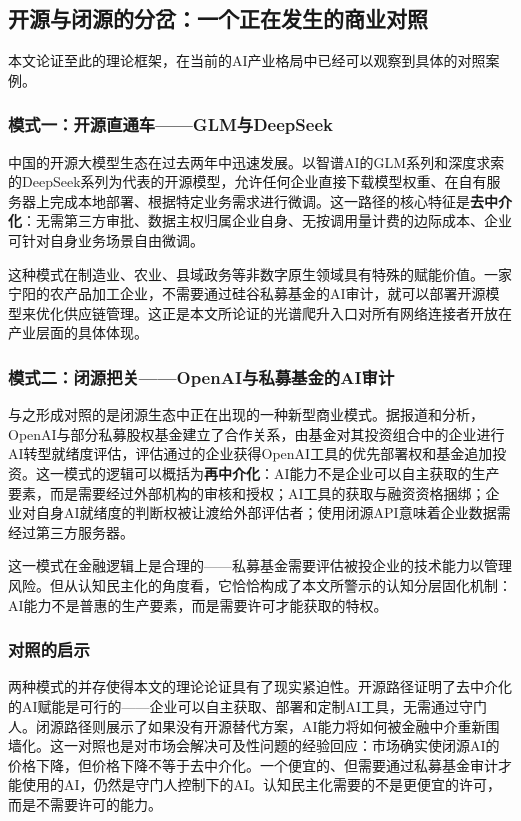 \documentclass[12pt,a4paper]{ctexart}
\begin{document}
\subsection{开源与闭源的分岔：一个正在发生的商业对照}

本文论证至此的理论框架，在当前的AI产业格局中已经可以观察到具体的对照案例。

\subsubsection{模式一：开源直通车——GLM与DeepSeek}

中国的开源大模型生态在过去两年中迅速发展。以智谱AI的GLM系列和深度求索的DeepSeek系列为代表的开源模型，允许任何企业直接下载模型权重、在自有服务器上完成本地部署、根据特定业务需求进行微调。这一路径的核心特征是\textbf{去中介化}：无需第三方审批、数据主权归属企业自身、无按调用量计费的边际成本、企业可针对自身业务场景自由微调。

这种模式在制造业、农业、县域政务等非数字原生领域具有特殊的赋能价值。一家宁阳的农产品加工企业，不需要通过硅谷私募基金的AI审计，就可以部署开源模型来优化供应链管理。这正是本文所论证的光谱爬升入口对所有网络连接者开放在产业层面的具体体现。

\subsubsection{模式二：闭源把关——OpenAI与私募基金的AI审计}

与之形成对照的是闭源生态中正在出现的一种新型商业模式。据报道和分析，OpenAI与部分私募股权基金建立了合作关系，由基金对其投资组合中的企业进行AI转型就绪度评估，评估通过的企业获得OpenAI工具的优先部署权和基金追加投资。这一模式的逻辑可以概括为\textbf{再中介化}：AI能力不是企业可以自主获取的生产要素，而是需要经过外部机构的审核和授权；AI工具的获取与融资资格捆绑；企业对自身AI就绪度的判断权被让渡给外部评估者；使用闭源API意味着企业数据需经过第三方服务器。

这一模式在金融逻辑上是合理的——私募基金需要评估被投企业的技术能力以管理风险。但从认知民主化的角度看，它恰恰构成了本文所警示的认知分层固化机制：AI能力不是普惠的生产要素，而是需要许可才能获取的特权。

\subsubsection{对照的启示}

两种模式的并存使得本文的理论论证具有了现实紧迫性。开源路径证明了去中介化的AI赋能是可行的——企业可以自主获取、部署和定制AI工具，无需通过守门人。闭源路径则展示了如果没有开源替代方案，AI能力将如何被金融中介重新围墙化。这一对照也是对市场会解决可及性问题的经验回应：市场确实使闭源AI的价格下降，但价格下降不等于去中介化。一个便宜的、但需要通过私募基金审计才能使用的AI，仍然是守门人控制下的AI。认知民主化需要的不是更便宜的许可，而是不需要许可的能力。
\end{document}

